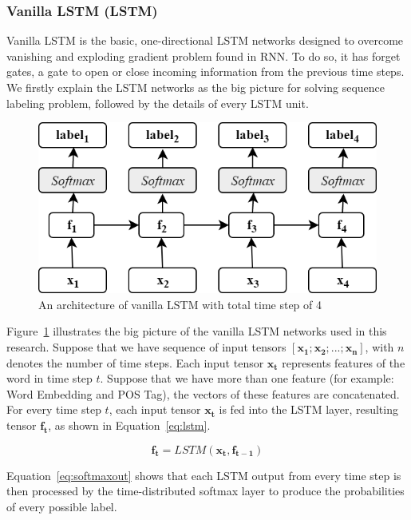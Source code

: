 \subsubsection{Vanilla LSTM (LSTM)}
Vanilla LSTM is the basic, one-directional LSTM networks designed to overcome vanishing and exploding gradient problem found in RNN. To do so, it has forget gates, a gate to open or close incoming information from the previous time steps. We firstly explain the LSTM networks as the big picture for solving sequence labeling problem, followed by the details of every LSTM unit. 

\begin{figure}
	\centering
	\includegraphics[width=0.75\linewidth]{images/olstm}
	\caption{An architecture of vanilla LSTM with total time step of 4}
	\label{fig:olstm}
\end{figure}

Figure~\ref{fig:olstm} illustrates the big picture of the vanilla LSTM networks used in this research. Suppose that we have sequence of input tensors $[\mathbf{x_{1}}; \mathbf{x_{2}}; ...; \mathbf{x_{n}}]$, with $n$ denotes the number of time steps. Each input tensor $\mathbf{x_{t}}$ represents features of the word in time step $t$. Suppose that we have more than one feature (for example: Word Embedding and POS Tag), the vectors of these features are concatenated. For every time step $t$, each input tensor $\mathbf{x_{t}}$ is fed into the LSTM layer, resulting tensor $\mathbf{f_{t}}$, as shown in Equation~\ref{eq:lstm}. 

\begin{equation}
\label{eq:lstm}
\mathbf{f_{t}} = LSTM(\mathbf{x_{t}}, \mathbf{f_{t-1}})
\end{equation}

Equation~\ref{eq:softmaxout} shows that each LSTM output from every time step is then processed by the time-distributed softmax layer to produce the probabilities of every possible label.

